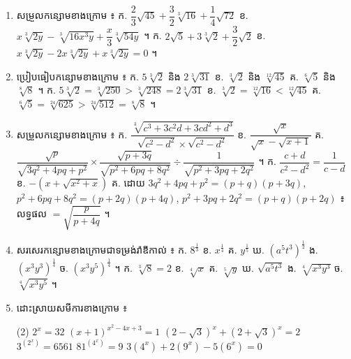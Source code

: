 \begin{enumerate}[1]
\begin{tasks}
    \task $\sqrt[3]{3}\times\sqrt[3]{5}$
    \task $\sqrt[4]{8}\times\sqrt[4]{9}\times\sqrt[4]{72}$
    \task $\sqrt{3a}\times\sqrt{10b}$
    \task $\sqrt{x - a}\times\sqrt{x + a}$
    \task $\sqrt{\frac{6}{x}}\times\sqrt{\frac{y}{5}}$
  \end{tasks}
  \ans
  ក. $\sqrt[3]{15}$ \quad ខ. $\sqrt[4]{5184} = \sqrt{72} = 6\sqrt{2}$ \quad គ. $\sqrt{30ab}$ \quad ឃ. $\sqrt{x^2 - a^2}$ \quad ង. $\sqrt{\dfrac{6y}{5x}}$ ។
  \item សម្រួលកន្សោមខាងក្រោម ៖ \quad ក. $\dfrac{2}{3}\sqrt{45} + \dfrac{3}{2}\sqrt[3]{16} + \dfrac{1}{4}\sqrt{72}$ \quad ខ. $x\sqrt[3]{2y} - \sqrt[3]{16x^3y} + \dfrac{x}{3}\sqrt[3]{54y}$ ។
  \ans
  ក. $2\sqrt{5} + 3\sqrt[3]{2} + \dfrac{3}{2}\sqrt{2}$ \quad ខ. $x\sqrt[3]{2y} - 2x\sqrt[3]{2y} + x\sqrt[3]{2y} = 0$ ។
  \item ប្រៀបធៀបកន្សោមខាងក្រោម ៖ \quad ក. $5\sqrt[3]{2}$ និង $2\sqrt[3]{31}$ \quad ខ. $\sqrt[3]{2}$ និង $\sqrt[12]{45}$ \quad គ. $\sqrt[6]{5}$ និង $\sqrt[8]{8}$ ។
  \ans
  ក. $5\sqrt[3]{2} = \sqrt[3]{250} > \sqrt[3]{248} = 2\sqrt[3]{31}$ \quad ខ. $\sqrt[3]{2} = \sqrt[12]{16} < \sqrt[12]{45}$ \quad គ. $\sqrt[6]{5} = \sqrt[24]{625} > \sqrt[24]{512} = \sqrt[8]{8}$ ។
  \item សម្រួលកន្សោមខាងក្រោម ៖ \quad ក. $\dfrac{\sqrt[3]{c^3 + 3c^2d + 3cd^2 + d^3}}{\sqrt{c^2 - d^2}\times\sqrt{c^2 - d^2}}$ \quad ខ. $\dfrac{\sqrt{x}}{\sqrt{x} - \sqrt{x + 1}}$ \quad គ. $\dfrac{\sqrt{p}}{\sqrt{3q^2 + 4pq + p^2}}\times\dfrac{\sqrt{p + 3q}}{\sqrt{p^2 + 6pq + 8q^2}} \div \dfrac{1}{\sqrt{p^2 + 3pq + 2q^2}}$ ។
  \ans
  ក. $\dfrac{c + d}{c^2 - d^2} = \dfrac{1}{c - d}$ \quad ខ. $-\left(x + \sqrt{x^2 + x}\right)$ \quad គ. ដោយ $3q^2 + 4pq + p^2 = (p + q)(p + 3q)$, $p^2 + 6pq + 8q^2 = (p + 2q)(p + 4q)$, $p^2 + 3pq + 2q^2 = (p + q)(p + 2q)$ ៖ លទ្ធផល $= \sqrt{\dfrac{p}{p + 4q}}$ ។
  \item សរសេរកន្សោមខាងក្រោមជាទម្រង់រ៉ាឌីកាល់ ៖ \quad ក. $8^{\frac{1}{3}}$ \quad ខ. $x^{\frac{1}{4}}$ \quad គ. $y^{\frac{1}{5}}$ \quad ឃ. $(a^5t^3)^{\frac{1}{2}}$ \quad ង. $(x^3y^3)^{\frac{1}{4}}$ \quad ច. $(x^3y^5)^{\frac{1}{4}}$ ។
  \ans
  ក. $\sqrt[3]{8} = 2$ \quad ខ. $\sqrt[4]{x}$ \quad គ. $\sqrt[5]{y}$ \quad ឃ. $\sqrt{a^5t^3}$ \quad ង. $\sqrt[4]{x^3y^3}$ \quad ច. $\sqrt[4]{x^3y^5}$ ។
  \item ដោះស្រាយសមីការខាងក្រោម ៖
  \begin{tasks}(2)
    \task $2^x = 32$
    \task $(x + 1)^{x^2 - 4x + 3} = 1$
    \task $(2 - \sqrt{3})^x + (2 + \sqrt{3})^x = 2$
    \task $3^{(2^x)} = 6561$
    \task $81^{(4^x)} = 9$
    \task $3(4^x) + 2(9^x) - 5(6^x) = 0$

\end{tasks}
\end{enumerate}
